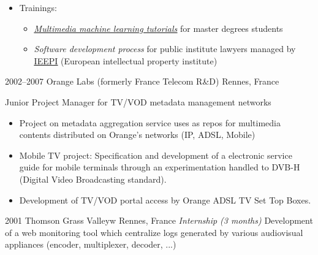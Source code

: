 \documentclass[]{friggeri-cv} %
\begin{document}
\begin{entrylist}
{\begin{itemize}
\begin{itemize}
\item A million of hits per month
\item 14 000 registered users
\item 4 300 hosted projects
\item 1 TB of data
\item 3 x Debian/VMWare OS + NetApp NFS 
\end{itemize}

\item Trainings:
\begin{itemize}
\item \href{https://github.com/scampion/multimedia-machine-learning-tutorials}{\underline{\emph{Multimedia machine learning tutorials}}} for master degrees students
\item \emph{Software development process} for public institute lawyers managed by \href{http://www.ieepi.org}{\underline{IEEPI}} (European intellectual property institute)
\end{itemize}
\end{itemize}
}

\entry
{2002--2007}
{Orange Labs {\normalfont  (formerly France Telecom R\&D)}}
{Rennes, France}
{Junior Project Manager for TV/VOD metadata management networks
\begin{itemize}
\item Project on metadata aggregation service uses as repos for multimedia contents distributed on Orange's networks (IP, ADSL, Mobile) 
\item Mobile TV project: Specification and development of a electronic service guide for mobile terminals\cite{4114771} through an experimentation handled to DVB-H (Digital Video Broadcasting standard).
\item Development of TV/VOD portal access by Orange ADSL TV Set Top Boxes.
\end{itemize}
}

\entry
{2001}
{Thomson Grass Valley}w
{Rennes, France}
{\emph{Internship (3 months)} Development of a web monitoring tool which centralize logs generated by various audiovisual appliances (encoder, multiplexer, decoder, ...) }

\end{entrylist}

\end{document}
